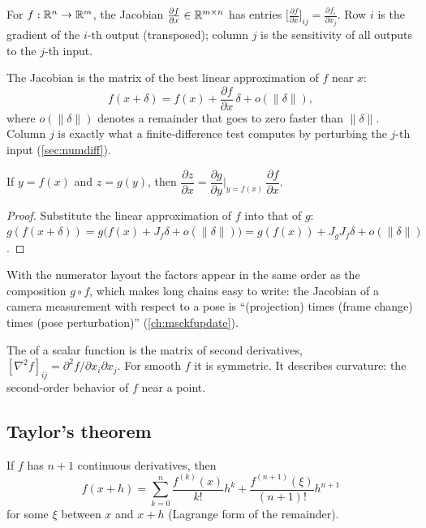 \begin{definition}
For $f: \mathbb{R}^n \to \mathbb{R}^m$, the Jacobian $\frac{\partial f}{\partial x} \in \mathbb{R}^{m\times n}$ has entries
$\big[\frac{\partial f}{\partial x}\big]_{ij} = \frac{\partial f_i}{\partial x_j}$. Row $i$ is the gradient of the $i$-th output (transposed); column $j$ is
the sensitivity of all outputs to the $j$-th input.
\end{definition}

The Jacobian is the matrix of the best linear approximation of $f$ near $x$:
\begin{equation}
  f(x + \delta) = f(x) + \frac{\partial f}{\partial x}\,\delta + o(\|\delta\|),
  \label{eq:linearization}
\end{equation}
where $o(\|\delta\|)$ denotes a remainder that goes to zero faster than $\|\delta\|$. Column $j$ is exactly what a finite-difference
test computes by perturbing the $j$-th input (\cref{sec:numdiff}).

\begin{proposition}
\label{prop:chain-rule}
If $y = f(x)$ and $z = g(y)$, then $\dfrac{\partial z}{\partial x} = \dfrac{\partial g}{\partial y}\Big|_{y = f(x)}\,\dfrac{\partial f}{\partial x}$.
\end{proposition}
\begin{proof}
Substitute the linear approximation of $f$ into that of $g$:
$g(f(x + \delta)) = g\big(f(x) + J_f\delta + o(\|\delta\|)\big) = g(f(x)) + J_gJ_f\delta + o(\|\delta\|)$.
\end{proof}

With the numerator layout the factors appear in the same order as the composition $g\circ f$, which makes long chains easy to write: the
Jacobian of a camera measurement with respect to a pose is ``(projection) times (frame change) times (pose perturbation)''
(\cref{ch:msckfupdate}).

The  of a scalar function is the matrix of second derivatives, $[\nabla^2f]_{ij} = \partial^2f/\partial x_i\partial x_j$. For smooth $f$ it is
symmetric. It describes curvature: the second-order behavior of $f$ near a point.

\subsection{Taylor's theorem}

\begin{theorem}
\label{thm:taylor}
If $f$ has $n + 1$ continuous derivatives, then
\begin{equation}
  f(x + h) = \sum_{k=0}^n\frac{f^{(k)}(x)}{k!}h^k + \frac{f^{(n+1)}(\xi)}{(n+1)!}h^{n+1}
\end{equation}
for some $\xi$ between $x$ and $x + h$ (Lagrange form of the remainder).
\end{theorem}

